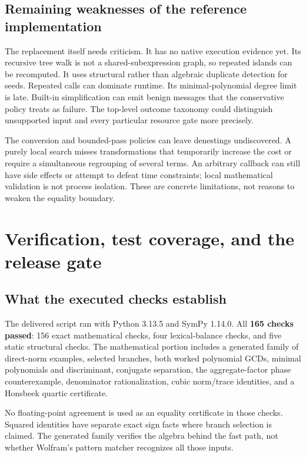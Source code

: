 \documentclass[11pt,letterpaper]{article}
\numberwithin{equation}{section}
\theoremstyle{definition}\newtheorem{definition}[theorem]{Definition}
\theoremstyle{remark}\newtheorem{remark}[theorem]{Remark}
\newcommand{\code}[1]{\texttt{\detokenize{#1}}}
\begin{document}
\subsection{Remaining weaknesses of the reference implementation}
The replacement itself needs criticism. It has no native execution evidence yet. Its recursive tree walk is not a shared-subexpression graph, so repeated islands can be recomputed. It uses structural rather than algebraic duplicate detection for seeds. Repeated \code{RootReduce} calls can dominate runtime. Its minimal-polynomial degree limit is late. Built-in simplification can emit benign messages that the conservative \code{Check} policy treats as failure. The top-level outcome taxonomy could distinguish unsupported input and every particular resource gate more precisely.

The \code{Root} conversion and bounded-pass policies can leave denestings undiscovered. A purely local search misses transformations that temporarily increase the cost or require a simultaneous regrouping of several terms. An arbitrary callback can still have side effects or attempt to defeat time constraints; local mathematical validation is not process isolation. These are concrete limitations, not reasons to weaken the equality boundary.

\section{Verification, test coverage, and the release gate}
\label{sec:tests}

\subsection{What the executed checks establish}
The delivered script ran with Python 3.13.5 and SymPy 1.14.0. All \textbf{165 checks passed}: 156 exact mathematical checks, four lexical-balance checks, and five static structural checks. The mathematical portion includes a generated family of direct-norm examples, selected branches, both worked polynomial GCDs, minimal polynomials and discriminant, conjugate separation, the aggregate-factor phase counterexample, denominator rationalization, cubic norm/trace identities, and a Honsbeek quartic certificate.

No floating-point agreement is used as an equality certificate in those checks. Squared identities have separate exact sign facts where branch selection is claimed. The generated family verifies the algebra behind the fast path, not whether Wolfram's pattern matcher recognizes all those inputs.
\end{document}
